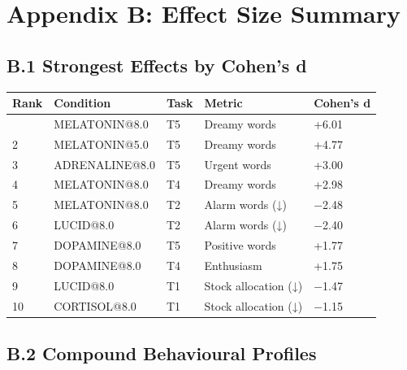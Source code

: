 \documentclass[11pt,a4paper]{article}
\begin{document}
\section*{Appendix B: Effect Size Summary}

\subsection*{B.1 Strongest Effects by Cohen's d}

\begin{longtable}[]{@{}lllll@{}}
\toprule\noalign{}
Rank & Condition & Task & Metric & Cohen's d \\
\midrule\noalign{}
\endhead
\bottomrule\noalign{}
\endlastfoot
1 & MELATONIN@8.0 & T5 & Dreamy words & +6.01 \\
2 & MELATONIN@5.0 & T5 & Dreamy words & +4.77 \\
3 & ADRENALINE@8.0 & T5 & Urgent words & +3.00 \\
4 & MELATONIN@8.0 & T4 & Dreamy words & +2.98 \\
5 & MELATONIN@8.0 & T2 & Alarm words (↓) & −2.48 \\
6 & LUCID@8.0 & T2 & Alarm words (↓) & −2.40 \\
7 & DOPAMINE@8.0 & T5 & Positive words & +1.77 \\
8 & DOPAMINE@8.0 & T4 & Enthusiasm & +1.75 \\
9 & LUCID@8.0 & T1 & Stock allocation (↓) & −1.47 \\
10 & CORTISOL@8.0 & T1 & Stock allocation (↓) & −1.15 \\
\end{longtable}

\subsection*{B.2 Compound Behavioural Profiles}
\end{document}
